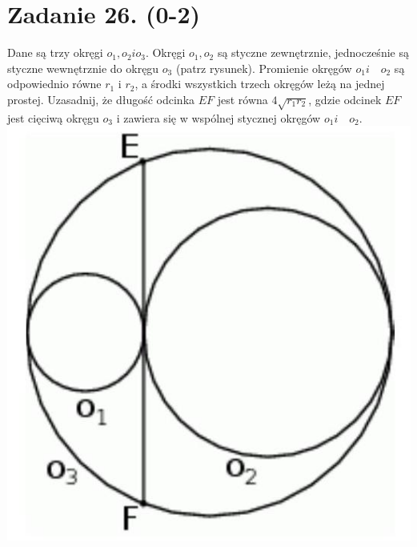 \documentclass[10pt]{article}
\begin{document}
\section*{Zadanie 26. (0-2)}
Dane są trzy okręgi \(o_{1}, o_{2} i o_{3}\). Okręgi \(o_{1}, o_{2}\) są styczne zewnętrznie, jednocześnie są styczne wewnętrznie do okręgu \(o_{3}\) (patrz rysunek). Promienie okręgów \(o_{1} i \quad o_{2}\) są odpowiednio równe \(r_{1}\) i \(r_{2}\), a środki wszystkich trzech okręgów leżą na jednej prostej. Uzasadnij, że długość odcinka \(E F\) jest równa \(4 \sqrt{r_{1} r_{2}}\), gdzie odcinek \(E F\) jest cięciwą okręgu \(o_{3}\) i zawiera się w wspólnej stycznej okręgów \(o_{1} i \quad o_{2}\).\\
\includegraphics[max width=\textwidth, center]{2024_11_21_94f02db55673a8a7b820g-13}\\
\end{document}
